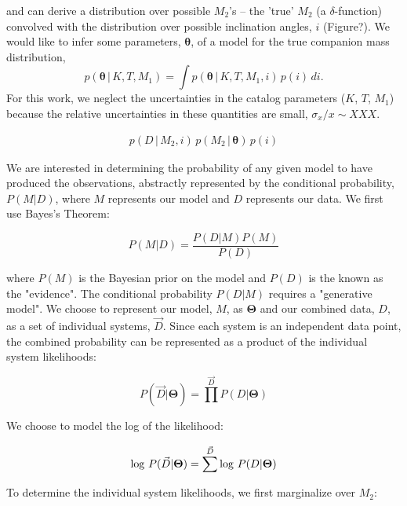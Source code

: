 \documentclass[letterpaper,12pt,preprint]{aastex}
\begin{document}
and can derive a distribution over possible $M_2$'s -- the 'true' $M_2$ (a $\delta$-function) convolved with the distribution over possible inclination angles, $i$ (Figure?). We would like to infer some parameters, $\boldsymbol{\theta}$, of a model for the true companion mass distribution, 
\begin{equation}
    p(\boldsymbol{\theta} \,|\, K, T, M_1) = \int p(\boldsymbol{\theta} \,|\, K, T, M_1, i)\,p(i)\,di.
\end{equation}
For this work, we neglect the uncertainties in the catalog parameters ($K$, $T$, $M_1$) because the relative uncertainties in these quantities are small, $\sigma_x / x \sim XXX$. 

\begin{align}
    p(D\,|\,M_2,i)\,p(M_2\,|\,\boldsymbol{\theta})\,p(i)
\end{align}


We are interested in determining the probability of any given model to have produced the observations, abstractly represented by the conditional probability, $P(M|D)$, where $M$ represents our model and $D$ represents our data. We first use Bayes's Theorem:

\begin{equation}
P(M|D) = \frac{P(D|M)P(M)}{P(D)}
\end{equation}

where $P(M)$ is the Bayesian prior on the model and $P(D)$ is the known as the "evidence". The conditional probability $P(D|M)$ requires a "generative model". We choose to represent our model, $M$, as $\mathbf{\Theta}$ and our combined data, $D$, as a set of individual systems, $\vec{D}$. Since each system is an independent data point, the combined probability can be represented as a product of the individual system likelihoods:

\begin{equation}
P(\vec{D}|\mathbf{\Theta}) = \prod^{\vec{D}}P(D | \mathbf{\Theta})
\end{equation}



We choose to model the log of the likelihood:

\begin{equation}
{\rm log}\ P(\vec{D}|\mathbf{\Theta}) = \sum^{\vec{D}} {\rm log}\ P(D | \mathbf{\Theta})
\end{equation}

To determine the individual system likelihoods, we first marginalize over $M_2$:
\end{document}
